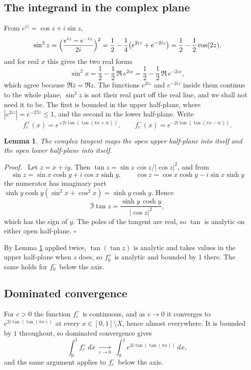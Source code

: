 \documentclass[11pt]{article}
\newtheorem{lemma}{Lemma}[section]
\newenvironment{proof}
  {\par\noindent\textit{Proof.}\ \ignorespaces}
  {\hfill$\square$\par\medskip}
\begin{document}
\subsection{The integrand in the complex plane}
From $e^{iz} = \cos z + i\sin z$,
\[
   \sin^2 z = \Bigl(\frac{e^{iz}-e^{-iz}}{2i}\Bigr)^2
   = \frac12 - \frac14\bigl(e^{2iz} + e^{-2iz}\bigr)
   = \frac12 - \frac12\cos(2z) ,
\]
and for real $x$ this gives the two real forms
\[
   \sin^2 x = \frac12 - \frac12\,\Re\,e^{2ix}
            = \frac12 - \frac12\,\Re\,e^{-2ix} ,
\]
which agree because $\Re \bar z = \Re z$. The functions $e^{2iz}$ and
$e^{-2iz}$ inside them continue to the whole plane; $\sin^2 z$ is not their
real part off the real line, and we shall not need it to be. The first is
bounded in the upper half-plane, where $|e^{2iz}| = e^{-2\Im z}\le 1$, and
the second in the lower half-plane. Write
\[
   f_c^{+}(x) = e^{+2i\tan(\tan(\pi x + ic))} , \qquad
   f_c^{-}(x) = e^{-2i\tan(\tan(\pi x - ic))} .
\]

\begin{lemma}\label{lem:tan}
The complex tangent maps the open upper half-plane into itself and the open
lower half-plane into itself.
\end{lemma}

\begin{proof}
Let $z = x+iy$. Then $\tan z = \sin z\,\overline{\cos z}/|\cos z|^2$, and
from
\[
   \sin z = \sin x\cosh y + i\cos x \sinh y , \qquad
   \cos z = \cos x\cosh y - i\sin x \sinh y
\]
the numerator has imaginary part
$\sinh y\cosh y(\sin^2 x + \cos^2 x) = \sinh y \cosh y$. Hence
\[
   \Im \tan z = \frac{\sinh y\,\cosh y}{|\cos z|^2} ,
\]
which has the sign of $y$. The poles of the tangent are real, so $\tan$ is
analytic on either open half-plane.
\end{proof}

By Lemma \ref{lem:tan} applied twice, $\tan(\tan z)$ is analytic and takes
values in the upper half-plane when $z$ does, so $f_0^{+}$ is analytic and
bounded by $1$ there. The same holds for $f_0^{-}$ below the axis.

\subsection{Dominated convergence}
For $c>0$ the function $f_c^{+}$ is continuous, and as $c \to 0$ it
converges to $e^{2i\tan(\tan(\pi x))}$ at every $x \in [0,1]\setminus X$,
hence almost everywhere. It is bounded by $1$ throughout, so dominated
convergence gives
\begin{equation}\label{eq:dct}
   \int_0^1 f_c^{+}\,dx \;\xrightarrow[c\to 0]{}\;
   \int_0^1 e^{2i\tan(\tan(\pi x))}\,dx ,
\end{equation}
and the same argument applies to $f_c^{-}$ below the axis.
\end{document}
